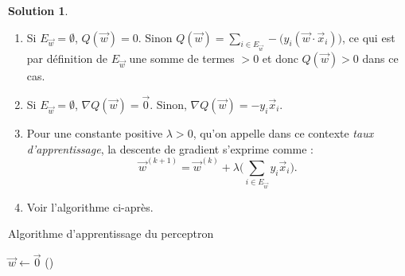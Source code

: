 \documentclass[a4paper,francais]{article}
\theoremstyle{definition}
\newtheorem*{solution}{Solution}
\begin{document}
\begin{solution}
  \begin{enumerate}
  \item Si $E_{\vec{w}} = \emptyset$, $Q(\vec{w}) = 0$.
    Sinon $Q(\vec{w}) = \sum_{i \in E_{\vec{w}}} - \big( y_i (\vec{w}\cdot\vec{x}_i) \big)$,
    ce qui est par définition de $E_{\vec{w}}$ une somme de termes $> 0$ et donc
    $Q(\vec{w}) > 0$ dans ce cas. 
  \item Si $E_{\vec{w}} = \emptyset$, ${\nabla Q}(\vec{w}) = \vec{0}$. Sinon,
    ${\nabla Q}(\vec{w}) = -y_i \vec{x}_i$.
  \item Pour une constante positive $\lambda > 0$, qu'on appelle dans ce
    contexte \emph{taux d'apprentissage}, la descente de gradient s'exprime
    comme :
    \[ \vec{w}^{(k+1)} = \vec{w}^{(k)} + \lambda \big( \sum_{i \in E_{\vec{w}}} y_i \vec{x}_i \big). \]
  \item Voir l'algorithme ci-après. 
  \end{enumerate}
    \begin{algorithm}[htbp]
    \caption{Algorithme d'apprentissage du perceptron}
    $\vec{w} \leftarrow \vec{0}$ \;
    ()
     \;
  \end{algorithm}
\end{solution}
\end{document}
